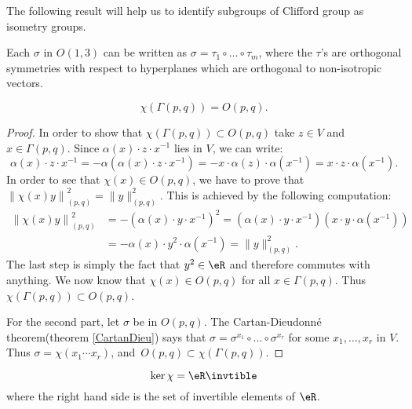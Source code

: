The following result will help us to identify subgroups of Clifford group as isometry groups.
\begin{theorem}
Each $\sigma$ in $O(1,3)$ can be written as
\hbox{$\sigma=\tau_1\circ\ldots\circ\tau_m$}, where the $\tau$'s are orthogonal symmetries with respect to hyperplanes which are orthogonal to non-isotropic vectors.
\label{CartanDieu}
\end{theorem}

\begin{proposition}
\[
              \chi(\Gamma(p,q))=O(p,q).
\]
\label{prop1001t1}
\end{proposition}

\begin{proof}
In order to show that $\chi(\Gamma(p,q))\subset O(p,q)$ take $z\in V$ and $x\in\Gamma(p,q)$. Since $\alpha(x)\cdot z\cdot x^{-1}$ lies in $V$, we can write:
\[
\alpha(x)\cdot z\cdot x^{-1}=-\alpha\left(\alpha(x)\cdot z\cdot x^{-1}\right)
=-x\cdot\alpha(z)\cdot\alpha(x^{-1})=x\cdot z\cdot\alpha(x^{-1}).
\]
In order to see that $\chi(x)\in O(p,q)$, we have to prove that $\left\|\chi(x)y\right\|_{(p,q)}^2=\|y\|_{(p,q)}^2$. This is achieved by the following computation:
\begin{equation}
\begin{split}
 \left\|\chi(x)y\right\|_{(p,q)}^2&=-\left(\alpha(x)\cdot y\cdot x^{-1}\right)^2
                                  =\left(\alpha(x)\cdot y\cdot x^{-1}\right)\left(x\cdot y\cdot\alpha(x^{-1})\right)\\
                                  &=-\alpha(x)\cdot y^2\cdot\alpha(x^{-1})
                                  =\|y\|^2_{(p,q)}.
\end{split}
\end{equation}
The last step is simply the fact that $y^2\in\eR$ and therefore commutes with anything. We now know that $\chi(x)\in O(p,q)$ for all $x\in\Gamma(p,q)$. Thus $\chi(\Gamma(p,q))\subset O(p,q)$.

For the second part, let $\sigma$ be in $O(p,q)$. The Cartan-Dieudonné theorem(theorem \ref{CartanDieu}) says that $\sigma=\sigma^{x_1}\circ\ldots\circ\sigma^{x_r}$ for some $x_1,\ldots, x_r$ in $V$. Thus $\sigma=\chi(x_1\cdots x_r)$, \hbox{and $O(p,q)\subset\chi(\Gamma(p,q))$}.
\end{proof}

\begin{proposition}
\begin{equation}
      \ker\chi=\eR\invtible
\end{equation}
where the right hand side is the set of invertible elements of $\eR$.
\label{prop1001p1}
\end{proposition}

